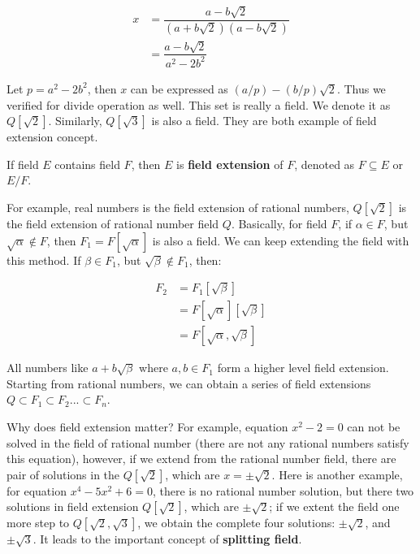 \documentclass{article}
\begin{document}
\[
\begin{array}{rl}
x & = \dfrac{a - b \sqrt{2}}{(a + b \sqrt{2})(a - b \sqrt{2})} \\[2ex]
  & = \dfrac{a - b \sqrt{2}}{a^2 - 2b^2}
\end{array}
\]

Let $p = a^2 - 2b^2$, then $x$ can be expressed as $(a/p) -(b/p)\sqrt{2}$. Thus we verified for divide operation as well. This set is really a field. We denote it as $Q[\sqrt{2}]$. Similarly, $Q[\sqrt{3}]$ is also a field. They are both example of field extension concept.

\begin{definition}
If field $E$ contains field $F$, then $E$ is \textbf{field extension} of $F$, denoted as $F \subseteq E$ or $E/F$.
\end{definition}

For example, real numbers is the field extension of rational numbers, $Q[\sqrt{2}]$ is the field extension of rational number field $Q$. Basically, for field $F$, if $\alpha \in F$, but $\sqrt{\alpha} \not\in F$, then $F_1 = F[\sqrt{\alpha}]$ is also a field. We can keep extending the field with this method. If $\beta \in F_1$, but $\sqrt{\beta} \not\in F_1$, then:

\[
\begin{array}{rl}
F_2 & = F_1[\sqrt{\beta}] \\
    & = F[\sqrt{\alpha}][\sqrt{\beta}] \\
    & = F[\sqrt{\alpha}, \sqrt{\beta}]
\end{array}
\]

All numbers like $a + b \sqrt{\beta}$ where $a, b \in F_1$ form a higher level field extension. Starting from rational numbers, we can obtain a series of field extensions $Q \subset F_1 \subset F_2 ... \subset F_n$.

Why does field extension matter? For example, equation $x^2 - 2 = 0$ can not be solved in the field of rational number (there are not any rational numbers satisfy this equation), however, if we extend from the rational number field, there are pair of solutions in the $Q[\sqrt{2}]$, which are $x = \pm \sqrt{2}$. Here is another example, for equation $x^4 - 5x^2 + 6 = 0$, there is no rational number solution, but there two solutions in field extension $Q[\sqrt{2}]$, which are $\pm \sqrt{2}$; if we extent the field one more step to $Q[\sqrt{2}, \sqrt{3}]$, we obtain the complete four solutions: $\pm \sqrt{2}$, and $\pm \sqrt{3}$. It leads to the important concept of \textbf{splitting field}.
\end{document}

